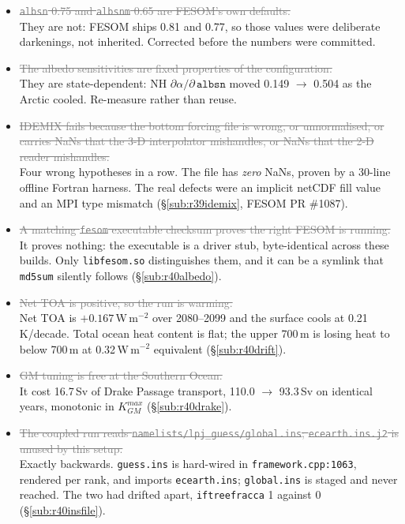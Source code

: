 \documentclass[10pt]{article}
\newcommand{\dead}[1]{\textcolor{gray}{\sout{#1}}}
\begin{document}
\begin{itemize}
\item \dead{\texttt{albsn} 0.75 and \texttt{albsnm} 0.65 are FESOM's own defaults.} \\ They are
      not: FESOM ships 0.81 and 0.77, so those values were deliberate darkenings, not
      inherited. Corrected before the numbers were committed.

\item \dead{The albedo sensitivities are fixed properties of the configuration.} \\ They are
      state-dependent: NH $\partial\alpha/\partial\,\texttt{albsn}$ moved 0.149 $\to$ 0.504 as
      the Arctic cooled. Re-measure rather than reuse.

\item \dead{IDEMIX fails because the bottom forcing file is wrong, or unnormalised, or carries
      NaNs that the 3-D interpolator mishandles, or NaNs that the 2-D reader mishandles.}
      \\ Four wrong hypotheses in a row. The file has \emph{zero} NaNs, proven by a 30-line
      offline Fortran harness. The real defects were an implicit netCDF fill value and an MPI
      type mismatch (\S\ref{sub:r39idemix}, FESOM PR \#1087).

\item \dead{A matching \texttt{fesom} executable checksum proves the right FESOM is running.}
      \\ It proves nothing: the executable is a driver stub, byte-identical across these
      builds. Only \texttt{libfesom.so} distinguishes them, and it can be a symlink that
      \texttt{md5sum} silently follows (\S\ref{sub:r40albedo}).

\item \dead{Net TOA is positive, so the run is warming.} \\ Net TOA is $+0.167$\,W\,m$^{-2}$
      over 2080--2099 and the surface cools at 0.21\,K/decade. Total ocean heat content is
      flat; the upper 700\,m is losing heat to below 700\,m at 0.32\,W\,m$^{-2}$ equivalent
      (\S\ref{sub:r40drift}).

\item \dead{GM tuning is free at the Southern Ocean.} \\ It cost 16.7\,Sv of Drake Passage
      transport, 110.0 $\to$ 93.3\,Sv on identical years, monotonic in $K_{GM}^{max}$
      (\S\ref{sub:r40drake}).

\item \dead{The coupled run reads \texttt{namelists/lpj\_guess/global.ins}; \texttt{ecearth.ins.j2}
      is unused by this setup.} \\ Exactly backwards. \texttt{guess.ins} is hard-wired in
      \texttt{framework.cpp:1063}, rendered per rank, and imports \texttt{ecearth.ins};
      \texttt{global.ins} is staged and never reached. The two had drifted apart,
      \texttt{iftreefracca} 1 against 0 (\S\ref{sub:r40insfile}).


\end{itemize}
\end{document}
